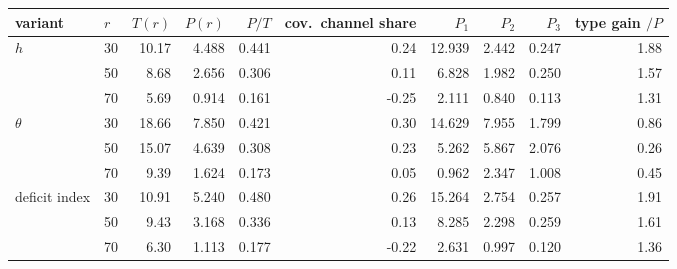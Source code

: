 \begin{tabular}{llrrrrrrrr}
\toprule
variant & $r$ & $T(r)$ & $P(r)$ & $P/T$ & cov.\ channel share & $P_1$ & $P_2$ & $P_3$ & type gain $/P$ \\
\midrule
$h$ & 30 & 10.17 & 4.488 & 0.441 & 0.24 & 12.939 & 2.442 & 0.247 & 1.88 \\
 & 50 & 8.68 & 2.656 & 0.306 & 0.11 & 6.828 & 1.982 & 0.250 & 1.57 \\
 & 70 & 5.69 & 0.914 & 0.161 & -0.25 & 2.111 & 0.840 & 0.113 & 1.31 \\
$\theta$ & 30 & 18.66 & 7.850 & 0.421 & 0.30 & 14.629 & 7.955 & 1.799 & 0.86 \\
 & 50 & 15.07 & 4.639 & 0.308 & 0.23 & 5.262 & 5.867 & 2.076 & 0.26 \\
 & 70 & 9.39 & 1.624 & 0.173 & 0.05 & 0.962 & 2.347 & 1.008 & 0.45 \\
deficit index & 30 & 10.91 & 5.240 & 0.480 & 0.26 & 15.264 & 2.754 & 0.257 & 1.91 \\
 & 50 & 9.43 & 3.168 & 0.336 & 0.13 & 8.285 & 2.298 & 0.259 & 1.61 \\
 & 70 & 6.30 & 1.113 & 0.177 & -0.22 & 2.631 & 0.997 & 0.120 & 1.36 \\
\bottomrule
\end{tabular}
